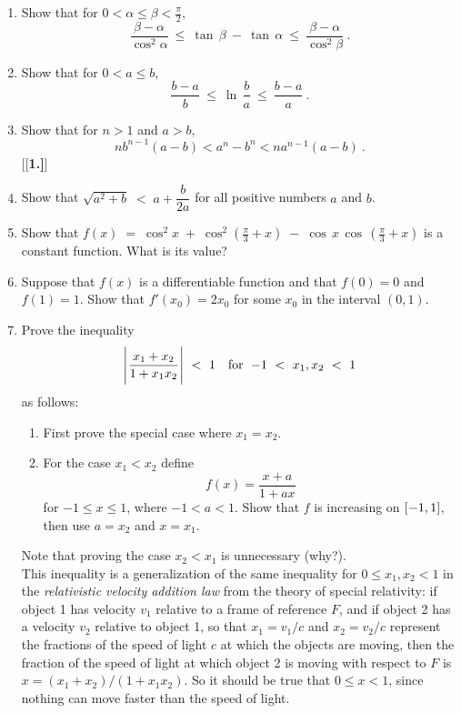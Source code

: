 {\begin{enumerate}[\bfseries 1.]
 \item Show that for $0 < \alpha \le \beta < \frac{\pi}{2}$,
\[
\frac{\beta - \alpha}{\cos^2 \alpha} ~\le~ \tan\,\beta ~-~ \tan\,\alpha
 ~\le~ \frac{\beta - \alpha}{\cos^2 \beta} ~.
\]
 \item Show that for $0 < a \le b$,
\[
\frac{b - a}{b} ~\le~ \ln\,\frac{b}{a} ~\le~ \frac{b - a}{a} ~.
\]
 \item Show that for $n > 1$ and $a > b$,
\[
nb^{n-1}(a-b) < a^n - b^n < na^{n-1}(a-b) ~.
\]
[{[\bfseries 1.]}]
 \item Show that $\sqrt{a^2 + b} \;<\; a + \dfrac{b}{2a}$ for all positive numbers
  $a$ and $b$.
 \item Show that $f(x) \;=\; \cos^2 x \;+\; \cos^2\left(\frac{\pi}{3}+x\right) \;-\; \cos\,x\,
 \cos\,\left(\frac{\pi}{3}+x\right)$ is a constant function. What is its value?
 \item Suppose that $f(x)$ is a differentiable function and that $f(0)=0$ and $f(1)=1$. Show that
  $f'(x_0) = 2x_0$ for some $x_0$ in the interval $(0,1)$.
 \item Prove the inequality
\[
\Biggl\lvert\mspace{1mu}\frac{x_1 + x_2}{1 + x_1 x_2}\mspace{1mu}\Biggr\rvert ~<~ 1 \quad\text{for $\;-1 ~<~ x_1, x_2 ~<~ 1$}
\]
as follows:
\begin{enumerate}[\bfseries (a)]
 \item First prove the special case where $x_1 = x_2$.
 \item For the case $x_1 < x_2$ define
\[
f(x) = \frac{x+a}{1+ax}
\]
 for $-1 \le x \le 1$, where $-1 < a < 1$. Show that $f$ is increasing on
 $\lbrack -1,1 \rbrack$, then use $a=x_2$ and $x=x_1$.
\end{enumerate}
Note that proving the case $x_2 < x_1$ is unnecessary (why?).\\This inequality is
a generalization of the same inequality for $0 \le x_1, x_2 < 1$ in the
\emph{relativistic velocity addition law}
from the theory of special relativity: if object 1 has velocity $v_1$ relative
to a frame of reference $F$, and if object 2 has a velocity $v_2$ relative to
object 1, so that $x_1 = v_1/c$ and $x_2 = v_2/c$  represent the
fractions of the speed of light $c$ at which the objects are moving, then
the fraction of the speed of light at which object 2 is moving with respect to
$F$ is $x = (x_1 + x_2)/(1 + x_1 x_2)$. So it should be true that $0 \le x < 1$,
since nothing can move faster than the speed of light.
\end{enumerate}
}
